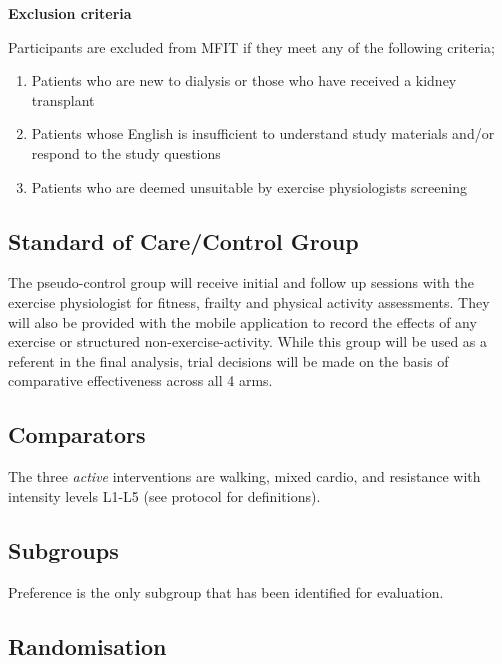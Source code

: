\documentclass[
]{article}
\providecommand{\tightlist}{%
  \setlength{\itemsep}{0pt}\setlength{\parskip}{0pt}}
\begin{document}
\textbf{Exclusion criteria}

Participants are excluded from MFIT if they meet any of the following criteria;

\begin{enumerate}
\def\labelenumi{\arabic{enumi}.}
\tightlist
\item Patients who are new to dialysis or those who have received a kidney transplant
\item Patients whose English is insufficient to understand study materials and/or respond to the study questions
\item Patients who are deemed unsuitable by exercise physiologists screening
\end{enumerate}

\hypertarget{standard-of-care}{%
\subsection{Standard of Care/Control Group}\label{standard-of-care}}

The pseudo-control group will receive initial and follow up sessions with the exercise physiologist for fitness, frailty and physical activity assessments. They will also be provided with the mobile application to record the effects of any exercise or structured non-exercise-activity.
While this group will be used as a referent in the final analysis, trial decisions will be made on the basis of comparative effectiveness across all 4 arms.

\hypertarget{comparators}{%
\subsection{Comparators}\label{stancomparators}}

The three \textit{active} interventions are walking, mixed cardio, and resistance with intensity levels L1-L5 (see protocol for definitions).

\hypertarget{subgroups}{%
\subsection{Subgroups}\label{subgroups}}

Preference is the only subgroup that has been identified for evaluation.

\hypertarget{randomisation}{%
\subsection{Randomisation}\label{randomisation}}
\end{document}
